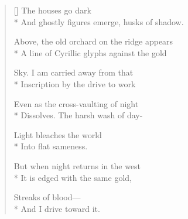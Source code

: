 \begin{verse}[\versewidth]
 The houses go dark\\*
And ghostly figures emerge, husks of shadow.

Above, the old orchard on the ridge appears\\*
A line of Cyrillic glyphs against the gold

Sky. I am carried away from that\\*
Inscription by the drive to work

Even as the cross-vaulting of night\\*
Dissolves.   The harsh wash of day-

Light bleaches the world\\*
Into flat sameness.

But when night returns in the west\\*
It is edged with the same gold,

Streaks of blood---\\*
And I drive toward it.
\end{verse}
